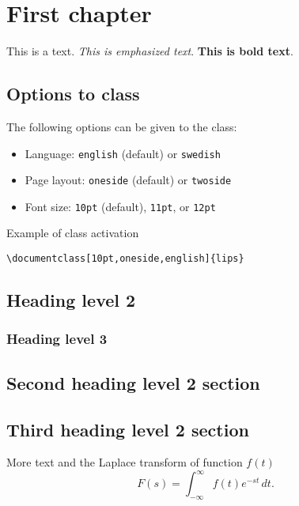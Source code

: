 \documentclass[10pt,oneside,english]{lips}
\begin{document}
\cleardoublepage
{}\cfoot{\thepage}

\section{First chapter}
This is a text. \emph{This is emphasized text}. \textbf{This is bold
  text}.


\subsection{Options to class}
The following options can be given to the class:
\begin{itemize}
\item Language: \texttt{english} (default) or \texttt{swedish}
\item Page layout: \texttt{oneside} (default) or \texttt{twoside}
\item Font size: \texttt{10pt} (default), \texttt{11pt}, or \texttt{12pt}
\end{itemize}
Example of class activation
\begin{verbatim}
\documentclass[10pt,oneside,english]{lips}
\end{verbatim}
\subsection{Heading level 2}
\label{sec:heading-level-2}
\lipsum[7]

\subsubsection{Heading level 3}
\label{sec:heading-level-3}
\lipsum[7]

\subsection{Second heading level 2 section}
\lipsum[7]

\subsection{Third heading level 2 section}
More text and the Laplace transform of function $f(t)$
\begin{equation}
  F(s) = \int_{-\infty}^{\infty} f(t)e^{-st}\,dt.
\end{equation}
\end{document}
